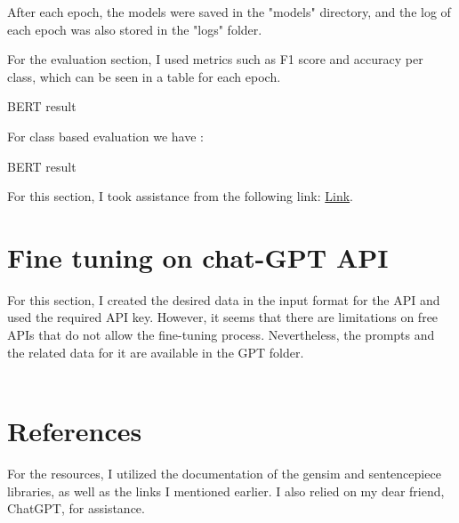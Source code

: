 \documentclass[a4paper]{article}
\begin{document}
After each epoch, the models were saved in the "models" directory, and the log of each epoch was also stored in the "logs" folder.

For the evaluation section, I used metrics such as F1 score and accuracy per class, which can be seen in a table for each epoch.

\begin{table}[ht]
    \centering
    \caption{BERT result}
    \label{tab:data}
\end{table}

\FloatBarrier

For class based evaluation we have : 

\begin{table}[ht]
    \centering
    \caption{BERT result}
    \label{tab:data}
\end{table}

\FloatBarrier

For this section, I took assistance from the following link: \href{https://towardsdatascience.com/multi-class-text-classification-with-deep-learning-using-bert-b59ca2f5c613}{Link}.


\section{Fine tuning on chat-GPT API}

For this section, I created the desired data in the input format for the API and used the required API key. However, it seems that there are limitations on free APIs that do not allow the fine-tuning process. Nevertheless, the prompts and the related data for it are available in the GPT folder.\\\\

\section*{References}

For the resources, I utilized the documentation of the gensim and sentencepiece libraries, as well as the links I mentioned earlier. I also relied on my dear friend, ChatGPT, for assistance.
\end{document}
